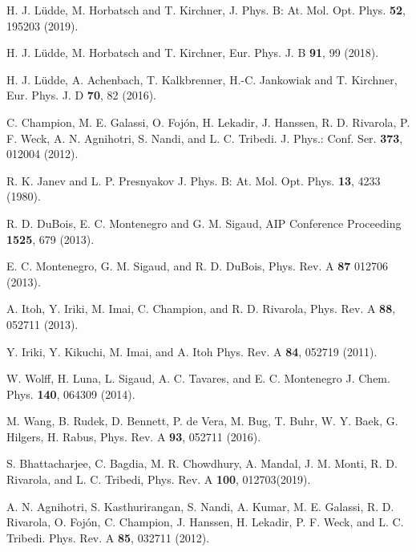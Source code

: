 \documentclass[10pt,showpacs,showkeys,twocolumn]{revtex4-1}
\begin{document}
\begin{thebibliography}{}
H. J. L\"udde,  M. Horbatsch and T. Kirchner, 
J. Phys. B: At. Mol. Opt. Phys. \textbf{52}, 195203 (2019).

H. J. L\"udde, M. Horbatsch and T. Kirchner, 
Eur. Phys. J. B \textbf{91}, 99 (2018).

H. J. L\"udde, A. Achenbach, T. Kalkbrenner, H.-C. Jankowiak and T. Kirchner,
Eur. Phys. J. D \textbf{70}, 82 (2016).

C. Champion, M. E. Galassi, O. Foj\'{o}n, H. Lekadir, J. Hanssen, 
R. D. Rivarola, P. F. Weck, A. N. Agnihotri, S. Nandi, and L. C. Tribedi. 
J. Phys.: Conf. Ser. \textbf{373}, 012004 (2012).


R. K. Janev and L. P. Presnyakov 
J. Phys. B: At. Mol. Opt. Phys.  \textbf{13}, 4233 (1980).

R. D. DuBois, E. C. Montenegro and G. M. Sigaud,
AIP Conference Proceeding \textbf{1525}, 679 (2013).

E. C. Montenegro, G. M. Sigaud, and R. D. DuBois, 
Phys. Rev. A \textbf{87} 012706 (2013).


A. Itoh, Y. Iriki, M. Imai, C. Champion, and R. D. Rivarola, 
Phys. Rev. A \textbf{88}, 052711 (2013).

Y. Iriki, Y. Kikuchi, M. Imai, and A. Itoh
Phys. Rev. A \textbf{84}, 052719 (2011). 


W. Wolff, H. Luna, L. Sigaud, A. C. Tavares, and E. C. Montenegro
J. Chem. Phys. \textbf{140}, 064309 (2014).

M. Wang, B. Rudek, D. Bennett, P. de Vera, M. Bug, T. Buhr, W. Y. Baek,
G. Hilgers, H. Rabus, 
Phys. Rev. A \textbf{93}, 052711 (2016).

S. Bhattacharjee, C. Bagdia, M. R. Chowdhury, A. Mandal, J. M. Monti, 
R. D. Rivarola, and L. C. Tribedi, 
Phys. Rev. A \textbf{100}, 012703(2019).

A. N. Agnihotri, S. Kasthurirangan, S. Nandi, A. Kumar, M. E. Galassi, 
R. D. Rivarola, O. Foj\'on, C. Champion, J. Hanssen, H. Lekadir, 
P. F. Weck, and L. C. Tribedi. 
Phys. Rev. A \textbf{85}, 032711 (2012).


\end{thebibliography}
\end{document}
